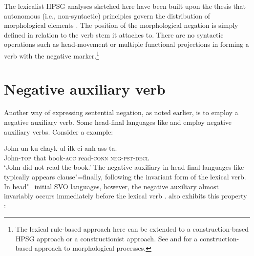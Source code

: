 \documentclass[output=paper
 	        ,biblatex
                ,babelshorthands
                ,newtxmath
                ,draftmode
                ,colorlinks, citecolor=brown
]{langscibook}
\begin{document}
\begin{exe}
\begin{xlist}
\begin{exe}
\begin{xlist}
The lexicalist HPSG analyses sketched here
 have been built upon the
thesis that autonomous (i.e., non-syntactic) principles govern the
distribution of morphological elements \citep{BM:95}.
The position of the morphological negation is simply
defined in relation to
the verb stem it attaches to. There are no syntactic operations such
as head-movement or multiple functional projections in forming
a verb with the negative marker.\footnote{The lexical rule-based
approach here can be extended to a construction-based HPSG
approach or a constructionist approach. See
\citet{Sag:12} and \citet{Hilpert:16} for a construction-based
approach to morphological processes.
}



\section{Negative auxiliary verb}
\label{sec-negative-auxiliary-verb}

Another way of expressing sentential negation, as noted earlier, is to employ
a negative auxiliary
verb. Some head-final languages like  and  employ
negative auxiliary verbs. Consider a  example:

\ea
\gll John-un ku chayk-ul ilk-ci anh-ass-ta. \\
     John-\textsc{top} that book-\textsc{acc} read-\textsc{conn} \textsc{neg}-\textsc{pst}-\textsc{decl}  \\
\glt `John did not read the book.'
\z
%
%
\noindent
The negative auxiliary in head-final languages like 
typically appears clause"=finally, following the invariant form of the lexical verb.
In head"=initial SVO languages, however, the negative auxiliary
almost invariably occurs immediately before the lexical verb
\citep{Payne:85}.  also exhibits this property \citep{Mitchell:91}:


\end{xlist}
\end{exe}
\end{xlist}
\end{exe}
\end{document}
